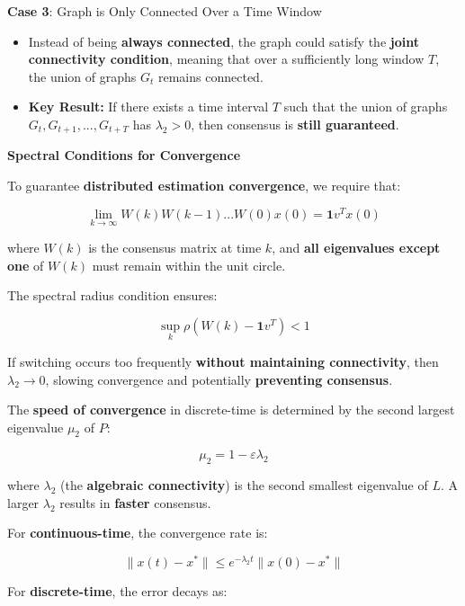 \documentclass[letterpaper, 10pt, conference]{ieeeconf}  %
\begin{document}
\textbf{Case 3}: Graph is Only Connected Over a Time Window
\begin{itemize}
    \item Instead of being \textbf{always connected}, the graph could satisfy the \textbf{joint connectivity condition}, meaning that over a sufficiently long window \( T \), the union of graphs \( G_t \) remains connected.
    \item \textbf{Key Result:} If there exists a time interval \( T \) such that the union of graphs \( G_{t}, G_{t+1}, ..., G_{t+T} \) has \( \lambda_2 > 0 \), then consensus is \textbf{still guaranteed}.
\end{itemize}

\textbf{Spectral Conditions for Convergence}

To guarantee \textbf{distributed estimation convergence}, we require that:

\[
\lim_{k \to \infty} W(k) W(k-1) ... W(0) x(0) = \mathbf{1} v^T x(0)
\]

where \( W(k) \) is the consensus matrix at time \( k \), and \textbf{all eigenvalues except one} of \( W(k) \) must remain within the unit circle.

The spectral radius condition ensures:

\[
\sup_k \rho(W(k) - \mathbf{1} v^T) < 1
\]

If switching occurs too frequently \textbf{without maintaining connectivity}, then \( \lambda_2 \to 0 \), slowing convergence and potentially \textbf{preventing consensus}.





The \textbf{speed of convergence} in discrete-time is determined by the second largest eigenvalue $\mu_2$ of $P$: \cite{Consensus_discret_Saber}

\begin{equation}
    \mu_2 = 1 - \varepsilon \lambda_2
\end{equation}

where $\lambda_2$ (the \textbf{algebraic connectivity}) is the second smallest eigenvalue of $L$. A larger $\lambda_2$ results in \textbf{faster} consensus.

For \textbf{continuous-time}, the convergence rate is:

\begin{equation}
    \| x(t) - x^* \| \leq e^{-\lambda_2 t} \| x(0) - x^* \|
\end{equation}

For \textbf{discrete-time}, the error decays as:
\end{document}
